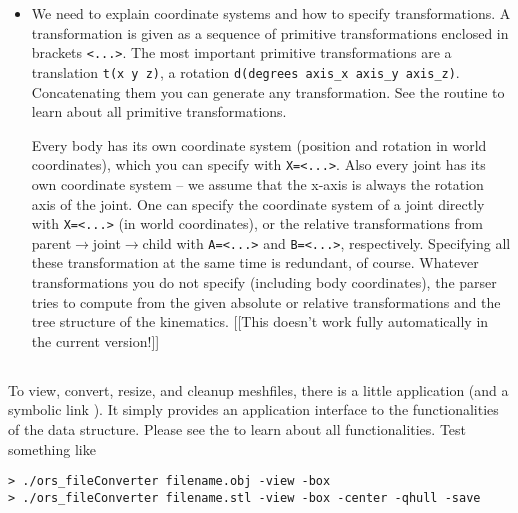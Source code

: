 \begin{itemize}
\item We need to explain coordinate systems and how to specify
 transformations. A transformation is given as a sequence of primitive
transformations enclosed in brackets \lstinline$<...>$. The most
important primitive transformations are a translation \lstinline$t(x y
z)$, a rotation \lstinline$d(degrees axis_x axis_y
axis_z)$. Concatenating them you can generate any transformation. See
the  routine to learn about all primitive
transformations.

Every body has its own coordinate system (position and rotation in
world coordinates), which you can specify
with \lstinline$X=<...>$. Also every joint has its own coordinate
system -- we assume that the x-axis is always the rotation axis of the
joint. One can specify the coordinate system of a joint directly
with \lstinline$X=<...>$ (in world coordinates), or the relative
transformations from parent$\to$joint$\to$child
with \lstinline$A=<...>$ and \lstinline$B=<...>$,
respectively. Specifying all these transformation at the same time is
redundant, of course. Whatever transformations you do not specify
(including body coordinates), the parser tries to compute from the
given absolute or relative transformations and the tree structure of
the kinematics. [[This doesn't work fully automatically in the current
version!]]

\end{itemize}


\subsection{}

To view, convert, resize, and cleanup meshfiles, there is a little
application  (and a symbolic
link ). It simply provides an
application interface to the functionalities of the  data
structure. Please see the  to
learn about all functionalities. Test something like
\begin{lstlisting}
> ./ors_fileConverter filename.obj -view -box
> ./ors_fileConverter filename.stl -view -box -center -qhull -save
\end{lstlisting}






